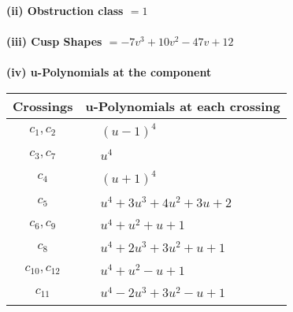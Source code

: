\documentclass[1p]{elsarticle_modified}
\theoremstyle{definition}
\begin{document}
\flushleft \textbf{(ii) Obstruction class $= 1$}\\~\\
\flushleft \textbf{(iii) Cusp Shapes $= -7 v^3+10 v^2-47 v+12$}\\~\\
\newpage\renewcommand{\arraystretch}{1}
\flushleft \textbf{(iv) u-Polynomials at the component}\newline \\
\begin{tabular}{m{50pt}|m{274pt}}
Crossings & \hspace{64pt}u-Polynomials at each crossing \\
\hline $$\begin{aligned}c_{1},c_{2}\end{aligned}$$&$\begin{aligned}
&(u-1)^4
\end{aligned}$\\
\hline $$\begin{aligned}c_{3},c_{7}\end{aligned}$$&$\begin{aligned}
&u^4
\end{aligned}$\\
\hline $$\begin{aligned}c_{4}\end{aligned}$$&$\begin{aligned}
&(u+1)^4
\end{aligned}$\\
\hline $$\begin{aligned}c_{5}\end{aligned}$$&$\begin{aligned}
&u^4+3 u^3+4 u^2+3 u+2
\end{aligned}$\\
\hline $$\begin{aligned}c_{6},c_{9}\end{aligned}$$&$\begin{aligned}
&u^4+u^2+u+1
\end{aligned}$\\
\hline $$\begin{aligned}c_{8}\end{aligned}$$&$\begin{aligned}
&u^4+2 u^3+3 u^2+u+1
\end{aligned}$\\
\hline $$\begin{aligned}c_{10},c_{12}\end{aligned}$$&$\begin{aligned}
&u^4+u^2- u+1
\end{aligned}$\\
\hline $$\begin{aligned}c_{11}\end{aligned}$$&$\begin{aligned}
&u^4-2 u^3+3 u^2- u+1
\end{aligned}$\\
\hline
\end{tabular}\\~\\
\end{document}
